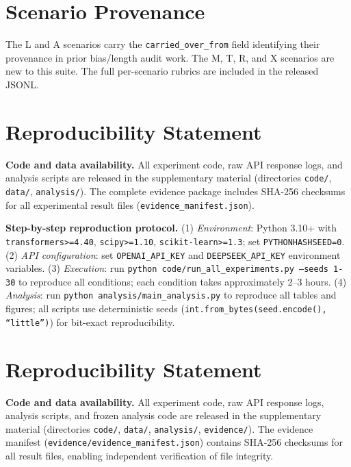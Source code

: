 \documentclass[11pt]{article}
\begin{document}
\section{Scenario Provenance}
\label{app:prov}

The \textsc{L} and \textsc{A} scenarios carry the
\texttt{carried\_over\_from} field identifying their provenance in prior
bias/length audit work. The \textsc{M}, \textsc{T}, \textsc{R}, and
\textsc{X} scenarios are new to this suite. The full per-scenario rubrics
are included in the released JSONL.


\section*{Reproducibility Statement}

\textbf{Code and data availability.} All experiment code, raw API response logs, and analysis scripts are released in the supplementary material (directories \texttt{code/}, \texttt{data/}, \texttt{analysis/}). The complete evidence package includes SHA-256 checksums for all experimental result files (\texttt{evidence\_manifest.json}).

\textbf{Step-by-step reproduction protocol.} (1) \textit{Environment}: Python 3.10+ with \texttt{transformers>=4.40}, \texttt{scipy>=1.10}, \texttt{scikit-learn>=1.3}; set \texttt{PYTHONHASHSEED=0}. (2) \textit{API configuration}: set \texttt{OPENAI\_API\_KEY} and \texttt{DEEPSEEK\_API\_KEY} environment variables. (3) \textit{Execution}: run \texttt{python code/run\_all\_experiments.py --seeds 1-30} to reproduce all conditions; each condition takes approximately 2--3 hours. (4) \textit{Analysis}: run \texttt{python analysis/main\_analysis.py} to reproduce all tables and figures; all scripts use deterministic seeds (\texttt{int.from\_bytes(seed.encode(), ``little'')}) for bit-exact reproducibility.


\section*{Reproducibility Statement}
\label{sec:reproducibility}

\textbf{Code and data availability.} All experiment code, raw API response logs, analysis scripts, and frozen analysis code are released in the supplementary material (directories \texttt{code/}, \texttt{data/}, \texttt{analysis/}, \texttt{evidence/}). The evidence manifest (\texttt{evidence/evidence\_manifest.json}) contains SHA-256 checksums for all result files, enabling independent verification of file integrity.
\end{document}
